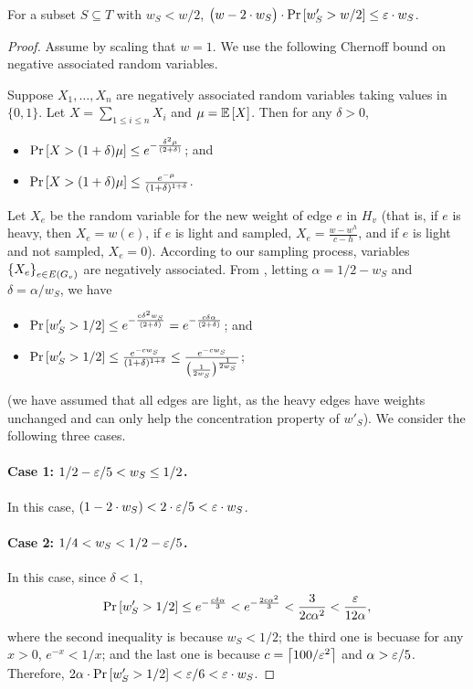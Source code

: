 \begin{claim}
\label{clm: difference in contribution}
For a subset $S\subseteq T$ with $w_S<w/2$, $\big(w-2\cdot w_S\big) \cdot \mathrm{Pr}\left[ w'_S>w/2 \right] \le {\varepsilon} \cdot w_S$.
\end{claim}
\begin{proof}
Assume by scaling that $w=1$.
%
We use the following Chernoff bound on negative associated random variables.
	
    \begin{lemma}  \label{chernoff}
		Suppose $X_1,\dots,X_n$ are negatively associated random variables taking values in $\{0,1\}$. Let $X=\sum_{1\le  i\le n}X_i$ and $\mu={\mathbb{E}}\left[ X \right]$. Then for any $\delta>0$,
		\begin{itemize}
			\item $\mathrm{Pr}\left[ X > (1+\delta)\mu \right] \le e^{-\frac{\delta^2 \mu}{(2+\delta)}}$; and
			\item $\mathrm{Pr}\left[ X > (1+\delta)\mu \right] \le \frac{e^{-\mu}}{(1+\delta)^{1+\delta}}$.
		\end{itemize}
	\end{lemma}
Let $X_e$ be the random variable for the new weight of edge $e$ in $H_v$ (that is, if $e$ is heavy, then $X_e=w(e)$, if $e$ is light and sampled, $X_e=\frac{w-w^h}{c-h}$, and if $e$ is light and not sampled, $X_e=0$). According to our sampling process, variables $\left\{ X_e \right\}_{e\in E(G_v)}$ are negatively associated.
From , letting $\alpha = 1/2 - w_S$ and $\delta = \alpha/w_S$, we have
%
	\begin{itemize}
		\item $\mathrm{Pr}\left[ w'_S > 1/2 \right] \le e^{-\frac{c \delta^2 w_S}{(2+\delta)}} = e^{-\frac{c \delta \alpha }{(2+\delta)}}$; and
		\item $\mathrm{Pr}\left[ w'_S > 1/2 \right] \le \frac{e^{-c w_S}}{(1+\delta)^{1+\delta}} \le \frac{e^{-c w_S}}{\big(\frac{1}{2w_S}\big)^{\frac{1}{2w_S}}}$;
	\end{itemize}
(we have assumed that all edges are light, as the heavy edges have weights unchanged and can only help the concentration property of $w'_S$).
We consider the following three cases. 
%	
	\paragraph{Case 1: $1/2 - {\varepsilon}/5 < w_S \le 1/2$.} In this case, $(1-2\cdot w_S)<2\cdot{\varepsilon}/5<{\varepsilon}\cdot w_S$.
%	
	\paragraph{Case 2: $1/4 < w_S < 1/2 - {\varepsilon}/5$.} In this case, since $\delta < 1$,
%
	\begin{align*}
	\mathrm{Pr}\left[ w'_S > 1/2 \right] \le e^{-\frac{c \delta \alpha}{3}} < e^{- \frac{2 c \alpha^2}{3}} < \frac{3}{2 c \alpha^2} < \frac{{\varepsilon}}{12\alpha},
	\end{align*}
%	
	where the second inequality is because $w_S < 1/2$; the third one is becuase for any $x>0$, $e^{-x}<1/x$; and the last one is because $c=\left\lceil 100/{\varepsilon}^2 \right\rceil$ and $\alpha>{\varepsilon}/5$. Therefore, $2\alpha \cdot \mathrm{Pr}\left[ w'_S > 1/2 \right] < {\varepsilon}/6 < {\varepsilon}\cdot w_S$. 
%	

\end{proof}
